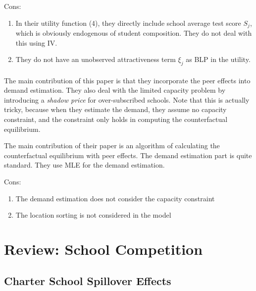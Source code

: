 Cons:
\vspace{-1em}
\begin{enumerate}
    \item In their utility function (4), they directly include school average test score $S_j$, which is obviously endogenous of student composition. They do not deal with this using IV.
    \item They do not have an unobserved attractiveness term $\xi_j$ as BLP in the utility.
\end{enumerate}

\paragraph{\citet{EppleJhaSieg2018}}

The main contribution of this paper is that they incorporate the peer effects into demand estimation. 
They also deal with the limited capacity problem by introducing a \textit{shadow price} for over-subscribed schools.
Note that this is actually tricky, because when they estimate the demand, they assume no capacity constraint, and the constraint only holds in computing the counterfactual equilibrium.

The main contribution of their paper is an algorithm of calculating the counterfactual equilibrium with peer effects.
The demand estimation part is quite standard.
They use MLE for the demand estimation.

Cons:
\begin{enumerate}
    \item The demand estimation does not consider the capacity constraint
    \item The location sorting is not considered in the model
\end{enumerate}


\section{Review: School Competition} %
\label{sec:review_spillover_effects}

\subsection*{Charter School Spillover Effects}

\paragraph{\citet*{BookerGilpatricGronbergEtAl2008}} 

